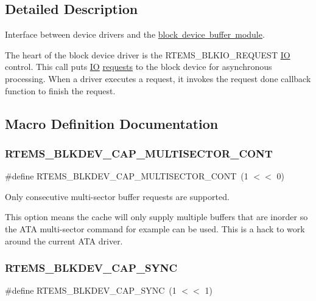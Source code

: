 \subsection{Detailed Description}
Interface between device drivers and the \mbox{\hyperlink{group__rtems__bdbuf}{block device buffer module}}.

The heart of the block device driver is the R\+T\+E\+M\+S\+\_\+\+B\+L\+K\+I\+O\+\_\+\+R\+E\+Q\+U\+E\+ST \mbox{\hyperlink{structIO}{IO}} control. This call puts \mbox{\hyperlink{structIO}{IO}} \mbox{\hyperlink{structrtems__blkdev__request}{requests}} to the block device for asynchronous processing. When a driver executes a request, it invokes the request done callback function to finish the request. 

\subsection{Macro Definition Documentation}
\mbox{\label{group__rtems__blkdev_ga25f2de1a9746d8b7d016ae12c51d5328}} 
\subsubsection{\texorpdfstring{RTEMS\_BLKDEV\_CAP\_MULTISECTOR\_CONT}{RTEMS\_BLKDEV\_CAP\_MULTISECTOR\_CONT}}
{\footnotesize\ttfamily \#define R\+T\+E\+M\+S\+\_\+\+B\+L\+K\+D\+E\+V\+\_\+\+C\+A\+P\+\_\+\+M\+U\+L\+T\+I\+S\+E\+C\+T\+O\+R\+\_\+\+C\+O\+NT~(1 $<$$<$ 0)}



Only consecutive multi-\/sector buffer requests are supported. 

This option means the cache will only supply multiple buffers that are inorder so the A\+TA multi-\/sector command for example can be used. This is a hack to work around the current A\+TA driver. \mbox{\label{group__rtems__blkdev_gab3164c0a50bb161d4a99177e1f08ef52}} 
\subsubsection{\texorpdfstring{RTEMS\_BLKDEV\_CAP\_SYNC}{RTEMS\_BLKDEV\_CAP\_SYNC}}
{\footnotesize\ttfamily \#define R\+T\+E\+M\+S\+\_\+\+B\+L\+K\+D\+E\+V\+\_\+\+C\+A\+P\+\_\+\+S\+Y\+NC~(1 $<$$<$ 1)}



